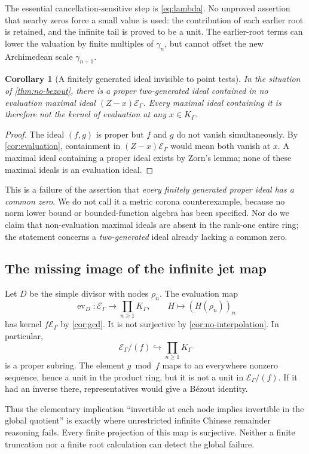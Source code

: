 \documentclass[11pt]{article}
\theoremstyle{plain}
\theoremstyle{plain}
\theoremstyle{plain}
\newtheorem{corollary}[corollary]{Corollary}
\theoremstyle{definition}
\theoremstyle{definition}
\theoremstyle{definition}
\theoremstyle{remark}
\newcommand{\K}{K_\Gamma}\newcommand{\E}{\mathcal E_\Gamma}
\begin{document}
The essential cancellation-sensitive step is \eqref{eq:lambda}.
No unproved assertion that nearby zeros force a small value is used:
the contribution of each earlier root is retained, and the infinite
tail is proved to be a unit. The earlier-root terms can lower the
valuation by finite multiples of $\gamma_n$, but cannot offset the
new Archimedean scale $\gamma_{n+1}$.

\begin{corollary}[A finitely generated ideal invisible to point tests]
\label{cor:invisible-ideal}
In the situation of \cref{thm:no-bezout}, there is a proper two-generated
ideal contained in no evaluation maximal ideal $(Z-x)\E$.
Every maximal ideal containing it is therefore not the kernel of
evaluation at any $x\in\K$.
\end{corollary}
\begin{proof}
The ideal $(f,g)$ is proper but $f$ and $g$ do not vanish simultaneously.
By \cref{cor:evaluation}, containment in $(Z-x)\E$ would mean both
vanish at $x$. A maximal ideal containing a proper ideal exists by
Zorn's lemma; none of these maximal ideals is an evaluation ideal.
\end{proof}

This is a failure of the assertion that \emph{every finitely generated
proper ideal has a common zero}. We do not call it a metric corona
counterexample, because no norm lower bound or bounded-function algebra
has been specified. Nor do we claim that non-evaluation maximal ideals
are absent in the rank-one entire ring; the statement concerns a
\emph{two-generated} ideal already lacking a common zero.

\subsection{The missing image of the infinite jet map}
Let $D$ be the simple divisor with nodes $\rho_n$. The evaluation map
\[
 \operatorname{ev}_D:\E\longrightarrow\prod_{n\ge1}\K,
 \qquad H\longmapsto(H(\rho_n))_n
\]
has kernel $f\E$ by \cref{cor:gcd}. It is not surjective by
\cref{cor:no-interpolation}. In particular,
\[
 \E/(f)\hookrightarrow\prod_{n\ge1}\K
\]
is a proper subring. The element $g\bmod f$ maps to an everywhere
nonzero sequence, hence a unit in the product ring, but it is not a
unit in $\E/(f)$. If it had an inverse there, representatives would
give a B\'ezout identity.

Thus the elementary implication ``invertible at each node implies
invertible in the global quotient'' is exactly where unrestricted
infinite Chinese remainder reasoning fails. Every finite projection
of this map is surjective. Neither a finite truncation nor a finite
root calculation can detect the global failure.
\end{document}
